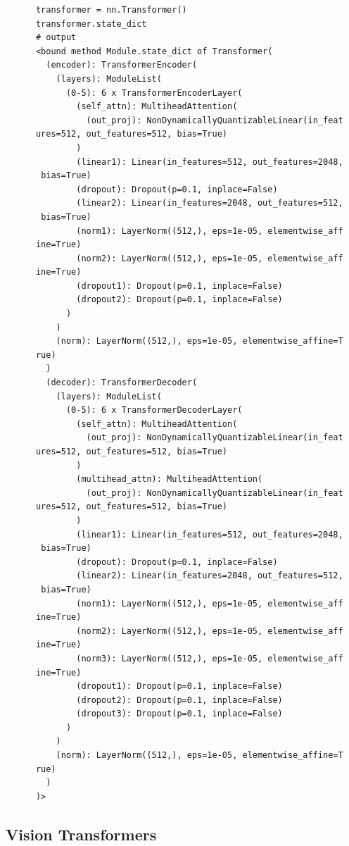     \begin{lstlisting}
      transformer = nn.Transformer()
      transformer.state_dict
      # output 
      <bound method Module.state_dict of Transformer(
        (encoder): TransformerEncoder(
          (layers): ModuleList(
            (0-5): 6 x TransformerEncoderLayer(
              (self_attn): MultiheadAttention(
                (out_proj): NonDynamicallyQuantizableLinear(in_feat
      ures=512, out_features=512, bias=True)
              )
              (linear1): Linear(in_features=512, out_features=2048,
       bias=True)
              (dropout): Dropout(p=0.1, inplace=False)
              (linear2): Linear(in_features=2048, out_features=512,
       bias=True)
              (norm1): LayerNorm((512,), eps=1e-05, elementwise_aff
      ine=True)
              (norm2): LayerNorm((512,), eps=1e-05, elementwise_aff
      ine=True)
              (dropout1): Dropout(p=0.1, inplace=False)
              (dropout2): Dropout(p=0.1, inplace=False)
            )
          )
          (norm): LayerNorm((512,), eps=1e-05, elementwise_affine=T
      rue)
        )
        (decoder): TransformerDecoder(
          (layers): ModuleList(
            (0-5): 6 x TransformerDecoderLayer(
              (self_attn): MultiheadAttention(
                (out_proj): NonDynamicallyQuantizableLinear(in_feat
      ures=512, out_features=512, bias=True)
              )
              (multihead_attn): MultiheadAttention(
                (out_proj): NonDynamicallyQuantizableLinear(in_feat
      ures=512, out_features=512, bias=True)
              )
              (linear1): Linear(in_features=512, out_features=2048,
       bias=True)
              (dropout): Dropout(p=0.1, inplace=False)
              (linear2): Linear(in_features=2048, out_features=512,
       bias=True)
              (norm1): LayerNorm((512,), eps=1e-05, elementwise_aff
      ine=True)
              (norm2): LayerNorm((512,), eps=1e-05, elementwise_aff
      ine=True)
              (norm3): LayerNorm((512,), eps=1e-05, elementwise_aff
      ine=True)
              (dropout1): Dropout(p=0.1, inplace=False)
              (dropout2): Dropout(p=0.1, inplace=False)
              (dropout3): Dropout(p=0.1, inplace=False)
            )
          )
          (norm): LayerNorm((512,), eps=1e-05, elementwise_affine=T
      rue)
        )
      )>
    \end{lstlisting}

\subsection{Vision Transformers} 

